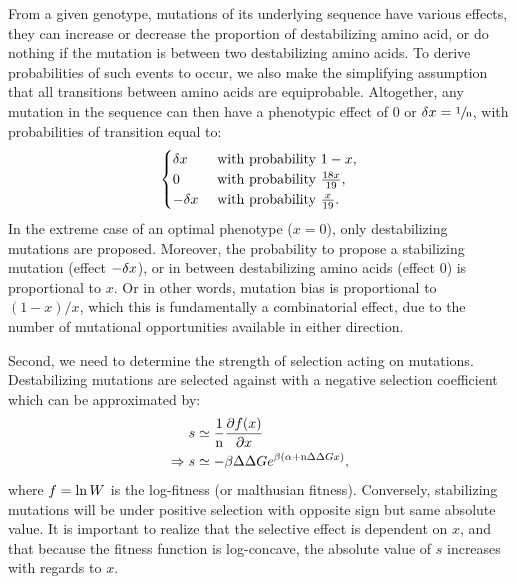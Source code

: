 From a given genotype, mutations of its underlying sequence have various effects, they can increase or decrease the proportion of destabilizing amino acid, or do nothing if the mutation is between two destabilizing amino acids.
To derive probabilities of such events to occur, we also make the simplifying assumption that all {transitions} between amino acids are equiprobable.
Altogether, any mutation in the sequence can then have a phenotypic effect of $0$ or $\delta x=\sfrac{1}{\text{n}}$, with probabilities of {transition} equal to:
\begin{gather}
    \begin{cases}
        \dx &\text{ with probability } 1-x, \\
        0 &\text{ with probability } \frac{18 x }{19}, \\
        -\dx &\text{ with probability } \frac{x}{19}.\\
    \end{cases} \label{eq:proba}
\end{gather}
In the extreme case of an optimal phenotype ($x = 0$), only destabilizing mutations are proposed.
Moreover, the probability to propose a stabilizing mutation (effect $-\delta x$), or in between destabilizing amino acids (effect $0$) is proportional to $x$.
Or in other words, mutation bias is proportional to $(1-x)/x$, which this is fundamentally a combinatorial effect, due to the number of mutational opportunities available in either direction.

Second, we need to determine the strength of selection acting on mutations.
Destabilizing mutations are selected against with a negative selection coefficient which can be approximated by:
\begin{align}
    s & \simeq \frac{1}{\Nsite}\frac{ \partial \logfit (x) }{\partial x} \label{eq:s} \\
    \Rightarrow s & \simeq - \beta \DeltaDeltaG e^{\beta (\DeltaGmin + \Nsite \DeltaDeltaG x)}, \label{eq:s-unfolded}
\end{align}
where $ f = \ln W$ is the log-fitness (or malthusian fitness).
Conversely, stabilizing mutations will be under positive selection with opposite sign but same absolute value.
It is important to realize that the selective effect is dependent on $x$, and that because the fitness function is log-concave, the absolute value of $s$ increases with regards to $x$.

